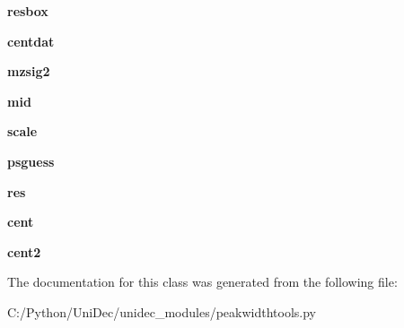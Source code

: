 \begin{DoxyCompactItemize}
\item 
\hypertarget{class_uni_dec_1_1unidec__modules_1_1peakwidthtools_1_1_peak_tools1d_a3cf33230e20912f5562357da2ec79d1d}{}{\bfseries resbox}\label{class_uni_dec_1_1unidec__modules_1_1peakwidthtools_1_1_peak_tools1d_a3cf33230e20912f5562357da2ec79d1d}

\item 
\hypertarget{class_uni_dec_1_1unidec__modules_1_1peakwidthtools_1_1_peak_tools1d_ac01214c4ecd880642cddea115722f077}{}{\bfseries centdat}\label{class_uni_dec_1_1unidec__modules_1_1peakwidthtools_1_1_peak_tools1d_ac01214c4ecd880642cddea115722f077}

\item 
\hypertarget{class_uni_dec_1_1unidec__modules_1_1peakwidthtools_1_1_peak_tools1d_a9624839fbd891be43ae90a601f738521}{}{\bfseries mzsig2}\label{class_uni_dec_1_1unidec__modules_1_1peakwidthtools_1_1_peak_tools1d_a9624839fbd891be43ae90a601f738521}

\item 
\hypertarget{class_uni_dec_1_1unidec__modules_1_1peakwidthtools_1_1_peak_tools1d_ae53f9bde184415fe506e82c6e0fa4739}{}{\bfseries mid}\label{class_uni_dec_1_1unidec__modules_1_1peakwidthtools_1_1_peak_tools1d_ae53f9bde184415fe506e82c6e0fa4739}

\item 
\hypertarget{class_uni_dec_1_1unidec__modules_1_1peakwidthtools_1_1_peak_tools1d_af212be0797dd5e125ed1d83754351596}{}{\bfseries scale}\label{class_uni_dec_1_1unidec__modules_1_1peakwidthtools_1_1_peak_tools1d_af212be0797dd5e125ed1d83754351596}

\item 
\hypertarget{class_uni_dec_1_1unidec__modules_1_1peakwidthtools_1_1_peak_tools1d_a8ad1c03f7fc886786deaf0332f27c03b}{}{\bfseries psguess}\label{class_uni_dec_1_1unidec__modules_1_1peakwidthtools_1_1_peak_tools1d_a8ad1c03f7fc886786deaf0332f27c03b}

\item 
\hypertarget{class_uni_dec_1_1unidec__modules_1_1peakwidthtools_1_1_peak_tools1d_a2cc4bd634e6efd5d5242aee536b86f33}{}{\bfseries res}\label{class_uni_dec_1_1unidec__modules_1_1peakwidthtools_1_1_peak_tools1d_a2cc4bd634e6efd5d5242aee536b86f33}

\item 
\hypertarget{class_uni_dec_1_1unidec__modules_1_1peakwidthtools_1_1_peak_tools1d_aa6645d39bb21687ce2666422c4fd6328}{}{\bfseries cent}\label{class_uni_dec_1_1unidec__modules_1_1peakwidthtools_1_1_peak_tools1d_aa6645d39bb21687ce2666422c4fd6328}

\item 
\hypertarget{class_uni_dec_1_1unidec__modules_1_1peakwidthtools_1_1_peak_tools1d_ac3ea5173acfac10cd7c867704dc93206}{}{\bfseries cent2}\label{class_uni_dec_1_1unidec__modules_1_1peakwidthtools_1_1_peak_tools1d_ac3ea5173acfac10cd7c867704dc93206}

\end{DoxyCompactItemize}


The documentation for this class was generated from the following file\+:\begin{DoxyCompactItemize}
\item 
C\+:/\+Python/\+Uni\+Dec/unidec\+\_\+modules/peakwidthtools.\+py\end{DoxyCompactItemize}
